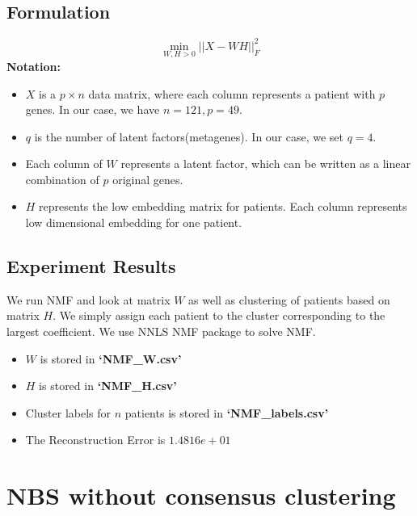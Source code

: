 \documentclass[11pt]{article}
\begin{document}
\subsection{Formulation}
\begin{equation}
	\underset{W,H>0}\min||X-WH||_F^2
\end{equation}
\textbf{Notation:}\\
\begin{itemize}
	\item{$X$ is a $p\times n$ data matrix, where each column represents a patient with $p$ genes. In our case, we have $n=121,p=49$.}
	\item{$q$ is the number of latent factors(metagenes). In our case, we set $q=4$.}
	\item{Each column of $W$ represents a latent factor, which can be written as a linear combination of $p$ original genes.}
	\item{$H$ represents the low embedding matrix for patients. Each column represents low dimensional embedding for one patient.}
\end{itemize}
\subsection{Experiment Results}
We run NMF and look at matrix $W$ as well as clustering of patients based on matrix $H$. We simply assign each patient to the cluster corresponding to the largest coefficient. We use NNLS NMF package\cite{nnls} to solve NMF.
\begin{itemize}
	\item{$W$ is stored in \textbf{`NMF\_W.csv'}}
	\item{$H$ is stored in \textbf{`NMF\_H.csv'}}
	\item{Cluster labels for $n$ patients is stored in \textbf{`NMF\_labels.csv'}}
	\item{The Reconstruction Error is $1.4816e+01$}
\end{itemize}

\section{NBS without consensus clustering}
\end{document}
